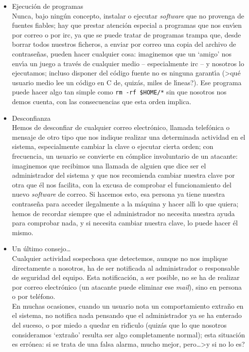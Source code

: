 \begin{itemize}
programas es muy simple de utilizar, y nos puede ahorrar muchos dolores de 
cabeza como administradores. Incluso existen clientes para Windows y MacOS, por
lo que nadie tiene excusa para no usar sistemas cifrados (se puede conseguir 
que su uso sea completamente {\bf transparente} al usuario); casi la mejor 
forma de que los usuarios los utilicen es dejando de ofrecer ciertos servicios
sin cifra, como {\tt telnet}, {\tt ftp}, {\tt rlogin} o {\tt rsh}.
\item Ejecuci\'on de programas\\
Nunca, bajo ning\'un concepto, instalar o ejecutar {\it software} que no
provenga de fuentes fiables; hay que prestar atenci\'on especial a programas
que nos env\'{\i}en por correo o por {\sc irc}, ya que se puede tratar de 
programas trampa que, desde borrar todos nuestros ficheros, a enviar por correo
una copia del archivo de contrase\~nas, pueden hacer cualquier cosa: imaginemos
que un `amigo' nos env\'{\i}a un juego a trav\'es de cualquier medio -- 
especialmente {\sc irc} -- y nosotros lo ejecutamos; incluso disponer del
c\'odigo fuente no es ninguna garant\'{\i}a (>qu\'e usuario medio lee un 
c\'odigo en C de, quiz\'as, miles de l\'{\i}neas?). Ese programa puede hacer
algo tan simple como {\tt rm -rf \$HOME/*} sin que nosotros nos demos cuenta,
con las consecuencias que esta orden implica.
\item Desconfianza\\
Hemos de desconfiar de cualquier correo electr\'onico, llamada telef\'onica o
mensaje de otro tipo que nos indique realizar una determinada actividad en el
sistema, especialmente cambiar la clave o ejecutar cierta orden; con 
frecuencia, un usuario se convierte en c\'omplice involuntario de un atacante:
imaginemos que recibimos una llamada de alguien que dice ser el administrador
del sistema y que nos recomienda cambiar nuestra clave por otra que \'el nos
facilita, con la excusa de comprobar el funcionamiento del nuevo {\it software} 
de correo. Si hacemos esto, esa persona ya tiene nuestra contrase\~na para 
acceder ilegalmente a la m\'aquina y hacer all\'{\i} lo que quiera; hemos de 
recordar siempre que el administrador no necesita nuestra ayuda para comprobar 
nada, y si necesita cambiar nuestra clave, lo puede hacer \'el mismo.
\item Un \'ultimo consejo\ldots\\
Cualquier actividad sospechosa que detectemos, aunque no nos implique 
directamente a nosotros, ha de ser notificada al administrador o responsable de
seguridad del equipo. Esta notificaci\'on, a ser posible, no se ha de realizar
por correo electr\'onico (un atacante puede eliminar ese {\it mail}), sino en
persona o por tel\'efono.\\
En muchas ocasiones, cuando un usuario nota un comportamiento extra\~no en el
sistema, no notifica nada pensando que el administrador ya se ha enterado del
suceso, o por miedo a quedar en rid\'{\i}culo (quiz\'as que lo que nosotros 
consideramos `extra\~no' resulta ser algo completamente normal); esta 
situaci\'on es err\'onea: si se trata de una falsa alarma, mucho mejor, 
pero\ldots >y si no lo es?
\end{itemize}
